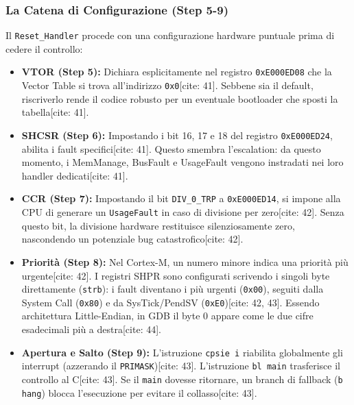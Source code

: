 \subsubsection*{La Catena di Configurazione (Step 5-9)}
Il \texttt{Reset\_Handler} procede con una configurazione hardware puntuale prima di cedere il controllo:
\begin{itemize}
    \item \textbf{VTOR (Step 5):} Dichiara esplicitamente nel registro \texttt{0xE000ED08} che la Vector Table si trova all'indirizzo \texttt{0x0}[cite: 41]. Sebbene sia il default, riscriverlo rende il codice robusto per un eventuale bootloader che sposti la tabella[cite: 41].
    \item \textbf{SHCSR (Step 6):} Impostando i bit 16, 17 e 18 del registro \texttt{0xE000ED24}, abilita i fault specifici[cite: 41]. Questo smembra l'escalation: da questo momento, i MemManage, BusFault e UsageFault vengono instradati nei loro handler dedicati[cite: 41].
    \item \textbf{CCR (Step 7):} Impostando il bit \texttt{DIV\_0\_TRP} a \texttt{0xE000ED14}, si impone alla CPU di generare un \texttt{UsageFault} in caso di divisione per zero[cite: 42]. Senza questo bit, la divisione hardware restituisce silenziosamente zero, nascondendo un potenziale bug catastrofico[cite: 42].
    \item \textbf{Priorità (Step 8):} Nel Cortex-M, un numero minore indica una priorità più urgente[cite: 42]. I registri SHPR sono configurati scrivendo i singoli byte direttamente (\texttt{strb}): i fault diventano i più urgenti (\texttt{0x00}), seguiti dalla System Call (\texttt{0x80}) e da SysTick/PendSV (\texttt{0xE0})[cite: 42, 43]. Essendo architettura Little-Endian, in GDB il byte 0 appare come le due cifre esadecimali più a destra[cite: 44].
    \item \textbf{Apertura e Salto (Step 9):} L'istruzione \texttt{cpsie i} riabilita globalmente gli interrupt (azzerando il \texttt{PRIMASK})[cite: 43]. L'istruzione \texttt{bl main} trasferisce il controllo al C[cite: 43]. Se il \texttt{main} dovesse ritornare, un branch di fallback (\texttt{b hang}) blocca l'esecuzione per evitare il collasso[cite: 43].
\end{itemize}

